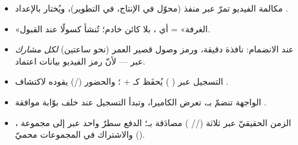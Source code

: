 \begin{summary}
\begin{itemize}
\item مكالمة الفيديو تمرّ عبر منفذ  (محوّل
   في الإنتاج،  في
  التطوير)، ويُختار بالإعداد .
\item «الغرفة» =  أي ، بلا كائن خادم؛ تُنشأ كسولًا
  عند القبول.
\item عند الانضمام: نافذة  دقيقة، ورمز وصول  قصير العمر (نحو ساعتين)
  \emph{لكل مشارك} عبر  — لأنّ رمز الفيديو بيانات
  اعتماد.
\item التسجيل عبر  ( \en{$\rightarrow$}
  ) يُحفَظ كـ + ؛ والحضور
  (/) يقوده 
  لاكتشاف .
\item الواجهة  تنضمّ بـ، تعرض الكاميرا، وتبدأ التسجيل
  عند  خلف بوّابة موافقة .
\item الزمن الحقيقيّ عبر ثلاثة  (//%
  ) مصادَقة بـ؛ الدفع سطرٌ واحد عبر 
  إلى مجموعة ، والاشتراك في المجموعات محميّ ().
\end{itemize}
\end{summary}
